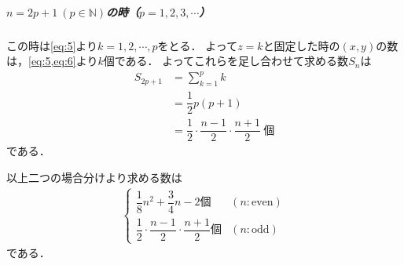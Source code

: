 \documentclass[../../main.tex]{subfiles}
\begin{document}
\subparagraph{$n=2p+1\ (p\in\mathbb{N})$の時（$p=1,2,3,\cdots$）}

この時は\cref{eq:5}より$k=1,2,\cdots,p$をとる．
よって$z=k$と固定した時の$(x,y)$の数は，\cref{eq:5,eq:6}より$k$個である．
よってこれらを足し合わせて求める数$S_n$は
\begin{align}
  S_{2p+1}
  &=\sum_{k=1}^{p}k \\
  &=\dfrac{1}{2}p(p+1) \\
  &=\dfrac{1}{2}\cdot\dfrac{n-1}{2}\cdot\dfrac{n+1}{2}\ \text{個}
\end{align}
である．
\casesend

以上二つの場合分けより求める数は
\begin{align}
  \begin{cases}\displaystyle
    \dfrac{1}{8}n^2+\dfrac{3}{4}n-2\text{個} & (n:\text{even}) \\[2mm]
    \dfrac{1}{2}\cdot\dfrac{n-1}{2}\cdot\dfrac{n+1}{2}\text{個} & (n:\text{odd})
  \end{cases}
\end{align}
である．

\newpage
\end{document}
